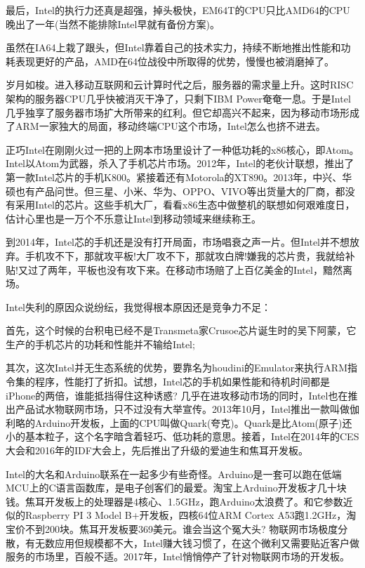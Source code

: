 \documentclass[utf8]{book}
\begin{document}
	最后，Intel的执行力还真是超强，掉头极快，EM64T的CPU只比AMD64的CPU晚出了一年(当然不能排除Intel早就有备份方案)。
	
	虽然在IA64上栽了跟头，但Intel靠着自己的技术实力，持续不断地推出性能和功耗表现更好的产品，AMD在64位战役中所取得的优势，慢慢也被消磨掉了。
	
	岁月如梭。进入移动互联网和云计算时代之后，服务器的需求量上升。这时RISC架构的服务器CPU几乎快被消灭干净了，只剩下IBM Power奄奄一息。于是Intel几乎独享了服务器市场扩大所带来的红利。但它却高兴不起来，因为移动市场形成了ARM一家独大的局面，移动终端CPU这个市场，Intel怎么也挤不进去。
	
	正巧Intel在刚刚火过一把的上网本市场里设计了一种低功耗的x86核心，即Atom。Intel以Atom为武器，杀入了手机芯片市场。2012年，Intel的老伙计联想，推出了第一款Intel芯片的手机K800。紧接着还有Motorola的XT890。2013年，中兴、华硕也有产品问世。但三星、小米、华为、OPPO、VIVO等出货量大的厂商，都没有采用Intel的芯片。这些手机大厂，看看x86生态中做整机的联想如何艰难度日，估计心里也是一万个不乐意让Intel到移动领域来继续称王。
	
	到2014年，Intel芯的手机还是没有打开局面，市场唱衰之声一片。但Intel并不想放弃。手机攻不下，那就攻平板!大厂攻不下，那就攻白牌!嫌我的芯片贵，我就给补贴!又过了两年，平板也没有攻下来。在移动市场赔了上百亿美金的Intel，黯然离场。
	
	Intel失利的原因众说纷纭，我觉得根本原因还是竞争力不足：
	
	首先，这个时候的台积电已经不是Transmeta家Crusoe芯片诞生时的吴下阿蒙，它生产的手机芯片的功耗和性能并不输给Intel;
	
	其次，这次Intel并无生态系统的优势，要靠名为houdini的Emulator来执行ARM指令集的程序，性能打了折扣。试想，Intel芯的手机如果性能和待机时间都是iPhone的两倍，谁能抵挡得住这种诱惑?
	几乎在进攻移动市场的同时，Intel也在推出产品试水物联网市场，只不过没有大举宣传。2013年10月，Intel推出一款叫做伽利略的Arduino开发板，上面的CPU叫做Quark(夸克)。Quark是比Atom(原子)还小的基本粒子，这个名字暗含着轻巧、低功耗的意思。接着，Intel在2014年的CES大会和2016年的IDF大会上，先后推出了升级的爱迪生和焦耳开发板。
	
	Intel的大名和Arduino联系在一起多少有些奇怪。Arduino是一套可以跑在低端MCU上的C语言函数库，是电子创客们的最爱。淘宝上Arduino开发板才几十块钱。焦耳开发板上的处理器是4核心、1.5GHz，跑Arduino太浪费了。和它参数近似的Raspberry PI 3 Model B+开发板，四核64位ARM Cortex A53跑1.2GHz，淘宝价不到200块。焦耳开发板要369美元。谁会当这个冤大头?
	物联网市场极度分散，有无数应用但规模都不大，Intel赚大钱习惯了，在这个微利又需要贴近客户做服务的市场里，百般不适。2017年，Intel悄悄停产了针对物联网市场的开发板。
	
\end{document}
